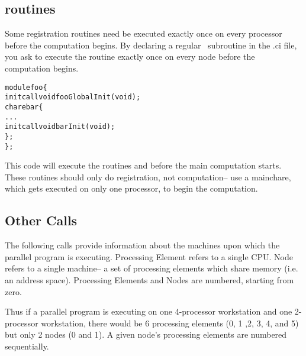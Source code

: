 \subsection{ routines}
\label{initcall}
\experimental{}
Some registration routines need be executed exactly once
on every processor before the computation begins.
By declaring a regular \CC\ subroutine 
 in the .ci file, you ask \charmpp to execute 
the routine exactly once on every node before the
computation begins.

\begin{alltt}
module foo \{
    initcall void fooGlobalInit(void);
    chare bar \{
        ...
        initcall void barInit(void);
    \};
\};
\end{alltt}

This code will execute the routines  and
 before the main computation starts.
These routines should only do registration, not computation--
use a mainchare, which gets executed on only one processor,
to begin the computation.

\subsection{Other Calls}

\label{other Charm++ calls}

The following calls provide information about the machines upon which the
parallel program is executing.  Processing Element refers to a single CPU.
Node refers to a single machine-- a set of processing elements which share
memory (i.e. an address space).  Processing Elements and Nodes are numbered,
starting from zero.

Thus if a parallel program is executing on one 4-processor workstation and one
2-processor workstation, there would be 6 processing elements (0, 1 ,2, 3, 4,
and 5) but only 2 nodes (0 and 1).  A given node's processing elements are
numbered sequentially.

 

 

 

